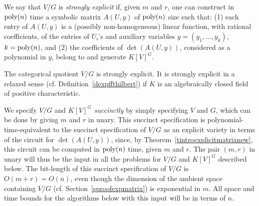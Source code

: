 \documentclass[11pt]{article}
\begin{document}
We say that  $V/G$ is 
{\em strongly explicit} 
if, given $m$ and $r$,   one can construct in ${\mbox {poly}}(n)$ time a 
symbolic matrix 
$A(U,y)$ of ${\mbox {poly}}(n)$ size such that:  (1) each entry of $A(U,y)$ is a (possibly non-homogeneous) linear function, with rational
coefficients,  of
the entries of $U_i$'s and auxiliary variables $y=(y_1,\ldots,y_k)$, $k={\mbox {poly}}(n)$, and 
(2) the coefficients of $\det(A(U,y))$, considered as a polynomial in $y$,  belong to and generate
$K[V]^G$.

\begin{theorem} \label{tintroexplicitmatrixnew}
The categorical quotient $V/G$ is strongly explicit.  It is strongly explicit in
a relaxed sense (cf. Definition~\ref{dexpffthilbert}) if $K$ is an algebraically closed field of positive characteristic.
\end{theorem}

We specify $V/G$ and $K[V]^G$  {\em succinctly} by simply specifying $V$ and $G$, which can be done  by giving $m$ and $r$ in unary.
This succinct specification is polynomial-time-equivalent  to the succinct specification of $V/G$ as an explicit variety in terms of the circuit for $\det(A(U,y))$, 
since, by Theorem~\ref{tintroexplicitmatrixnew},  this circuit can be computed in ${\mbox {poly}}(n)$ 
time, given $m$ and $r$. 
The pair $(m,r)$ in unary  will thus  be the input in all the  problems for $V/G$ and $K[V]^G$ described below.
The bit-length of this succinct specification of $V/G$  is $O(m+r)=O(n)$, 
even though the dimension of the ambient space containing $V/G$ 
(cf. Section~\ref{sproofexpmatrix}) is 
exponential in $m$. All  space and time bounds for the algorithms below with this input will be in terms of $n$. 
\end{document}
